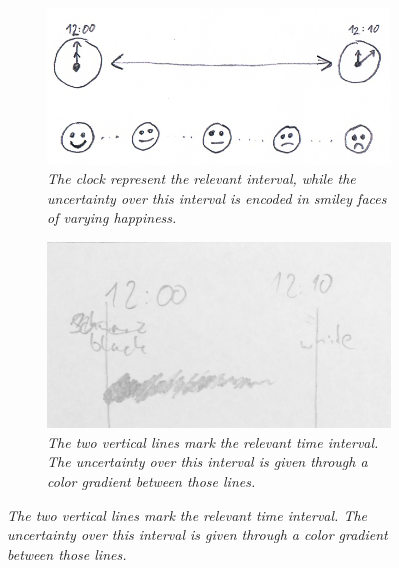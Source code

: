 \begin{itemize}
	\begin{figure}[h]
		\begin{subfigure}[t]{.4\textwidth}
			\centering
			\includegraphics[width=\linewidth]{figures/icons.png}
			\caption{\textit{The clock represent the relevant interval, while the uncertainty over this interval is encoded in smiley faces of varying happiness.}}
			\label{fig:icons}
		\end{subfigure}
		\hfill
		\begin{subfigure}[t]{.4\textwidth}
			\centering
			\includegraphics[width=\linewidth]{figures/color.jpg}
			\caption{\textit{The two vertical lines mark the relevant time interval. The uncertainty over this interval is given through a color gradient between those lines.}}
			\label{fig:color}
		\end{subfigure}
		
		\medskip
		

\end{figure}
\end{itemize}

